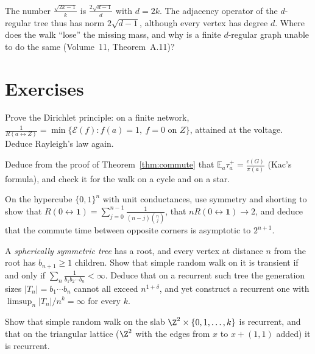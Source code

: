 \begin{think}
The number $\frac{\sqrt{2k-1}}k$ is $\frac{2\sqrt{d-1}}d$ with $d=2k$. The adjacency operator of the $d$-regular tree thus has norm $2\sqrt{d-1}$, although every vertex has degree $d$. Where does the walk ``lose'' the
missing mass, and why is a finite $d$-regular graph unable to do the same (Volume~11, Theorem~A.11)?
\end{think}

\section{Exercises}

\begin{exercise}[$\star$]\label{ex:dirichletprinciple}
Prove the Dirichlet principle: on a finite network, $\frac1{R(a\leftrightarrow Z)}=\min\{\mathcal E(f):f(a)=1,\ f=0\text{ on }Z\}$, attained at the voltage. Deduce Rayleigh's law again.
\end{exercise}

\begin{exercise}[$\star$]\label{ex:kac}
Deduce from the proof of Theorem~\ref{thm:commute} that $\mathbb E_a\tau_a^+=\frac{c(G)}{\pi(a)}$ (Kac's formula), and check it for the walk on a cycle and on a star.
\end{exercise}

\begin{exercise}[$\star$]\label{ex:hypercube}
On the hypercube $\{0,1\}^n$ with unit conductances, use symmetry and shorting to show that $R(0\leftrightarrow\mathbf 1)=\sum_{j=0}^{n-1}\frac1{(n-j)\binom nj}$, that $nR(0\leftrightarrow\mathbf 1)\to2$, and deduce that the
commute time between opposite corners is asymptotic to $2^{n+1}$.
\end{exercise}

\begin{exercise}[$\star\star$]\label{ex:spherical}
A \emph{spherically symmetric tree} has a root, and every vertex at distance $n$ from the root has $b_{n+1}\ge1$ children. Show that simple random walk on it is transient if and only if $\sum_n\frac1{b_1b_2\cdots b_n}<\infty$. Deduce that on a recurrent such tree the generation sizes $|T_n|=b_1\cdots b_n$
cannot all exceed $n^{1+\delta}$, and yet construct a recurrent one with $\limsup_n|T_n|/n^k=\infty$ for every $k$.
\end{exercise}

\begin{exercise}[$\star\star$]\label{ex:slab}
Show that simple random walk on the slab $\Z^2\times\{0,1,\dots,k\}$ is recurrent, and that on the triangular lattice ($\Z^2$ with the edges from $x$ to $x+(1,1)$ added) it is recurrent.
\end{exercise}

